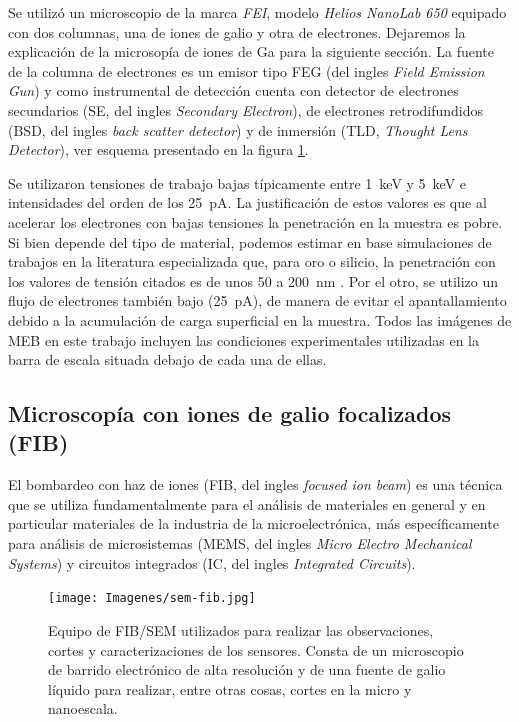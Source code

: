 		Se utilizó un microscopio de la marca \textit{FEI}, modelo \textit{Helios NanoLab 650} equipado con dos columnas, una de iones de galio y otra de electrones. Dejaremos la explicación de la microsopía de iones de Ga para la siguiente sección. La fuente de la columna de electrones es un emisor tipo FEG (del ingles \textit{Field Emission Gun}) y como instrumental de detección cuenta con detector de electrones secundarios (SE, del ingles \textit{Secondary Electron}), de electrones retrodifundidos (BSD, del ingles \textit{back scatter detector}) y de inmersión (TLD, \textit{Thought Lens Detector}), ver esquema presentado en la figura \ref{fig:sem-fib}. 

		Se utilizaron tensiones de trabajo bajas típicamente entre \SI{1}{\kilo\electronvolt} y \SI{5}{\kilo\electronvolt} e intensidades del orden de los \SI{25}{\pA}. La justificación de estos valores es que al acelerar los electrones con bajas tensiones la penetración en la muestra es pobre. Si bien depende del tipo de material, podemos estimar en base simulaciones de trabajos en la literatura especializada que, para oro o silicio, la penetración con los valores de tensión citados es de unos 50 a \SI{200}{\nm} \cite{Joy1984,Shur2012,Hafner2007}. Por el otro, se utilizo un flujo de electrones también bajo (\SI{25}{\pA}), de manera de evitar el apantallamiento debido a la acumulación de carga superficial en la muestra. Todos las imágenes de MEB en este trabajo incluyen las condiciones experimentales utilizadas en la barra de escala situada debajo de cada una de ellas.

	\subsection{Microscopía con iones de galio focalizados (FIB)}\label{sec:FIB}

		El bombardeo con haz de iones (FIB, del ingles \textit{focused ion beam}) es una técnica que se utiliza fundamentalmente para el análisis de materiales en general y en particular materiales de la industria de la microelectrónica, más específicamente para análisis de microsistemas (MEMS, del ingles \textit{Micro Electro Mechanical Systems}) y circuitos integrados (IC, del ingles \textit{Integrated Circuits}).

			\begin{figure}[ht]
			 		  \begin{center}
			 		  \texttt{[image: Imagenes/sem-fib.jpg]}
			 		  \caption[Microscopio de doble haz FIB/SEM]{Equipo de FIB/SEM utilizados para realizar las observaciones, cortes y caracterizaciones de los sensores. Consta de un microscopio de barrido electrónico de alta resolución y de una fuente de galio líquido para realizar, entre otras cosas, cortes en la micro y nanoescala.}
			 		  \label{fig:sem-fib}
			 		  \end{center}
			 		  \end{figure}

